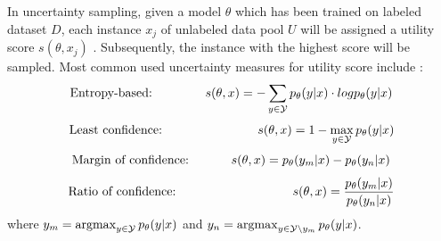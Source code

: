 In uncertainty sampling, given a model $\theta$ which has been trained on labeled dataset $D$, each instance $x_j$ of unlabeled data pool $U$ will be assigned a utility score $s(\theta, x_j)$ \cite{nguyen2021howtomeasure}.
Subsequently, the instance with the highest score will be sampled.
Most common used uncertainty measures for utility score include \cite{human-in-the-loop}:
\begin{equation}
    \text{Entropy-based:}\hspace{15mm}
     s(\theta, x) = - \sum_{y \in \mathcal{Y}}{p_{\theta}(y | x) \cdot log p_{\theta}(y|x)}
\end{equation}
\begin{equation}
    \text{Least confidence:}\hspace{27mm}
     s(\theta, x) = 1 - \max_{y \in \mathcal{Y}}{p_{\theta}(y | x)}
\end{equation}
\begin{equation}
    \text{Margin of confidence:}\hspace{12mm}
    s(\theta, x) = p_{\theta}(y_m | x) - p_{\theta}(y_n|x)
\end{equation}
\begin{equation}
    \text{Ratio of confidence:}\hspace{33mm}
    s(\theta, x) = \frac{p_{\theta}(y_m | x)}{p_{\theta}(y_n|x)}
\end{equation}
where
$y_m = \operatorname*{argmax}_{y \in \mathcal{Y}} p_{\theta}(y | x)$ 
and 
$y_n = \operatorname*{argmax}_{y \in \mathcal{Y} \setminus y_m}{p_{\theta}(y | x)}$.

